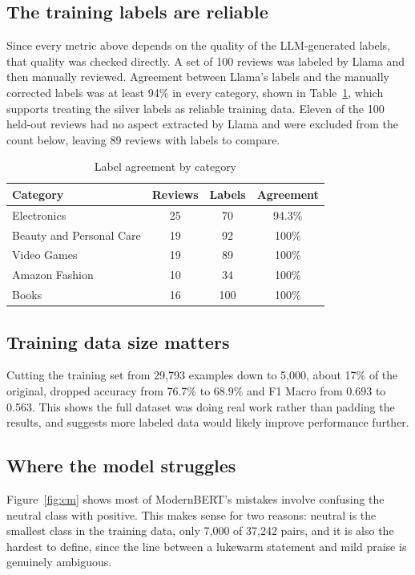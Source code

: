 \documentclass[sigconf]{acmart}
\begin{document}
\subsection{The training labels are reliable}

Since every metric above depends on the quality of the LLM-generated labels, that quality was checked directly. A set of 100 reviews was labeled by Llama and then manually reviewed. Agreement between Llama's labels and the manually corrected labels was at least 94\% in every category, shown in Table~\ref{tab:agreement}, which supports treating the silver labels as reliable training data. Eleven of the 100 held-out reviews had no aspect extracted by Llama and were excluded from the count below, leaving 89 reviews with labels to compare.

\begin{table}[h]
\centering
\caption{Label agreement by category}
\label{tab:agreement}
\begin{tabular}{lccc}
\toprule
\textbf{Category} & \textbf{Reviews} & \textbf{Labels} & \textbf{Agreement} \\
\midrule
Electronics & 25 & 70 & 94.3\% \\
Beauty and Personal Care & 19 & 92 & 100\% \\
Video Games & 19 & 89 & 100\% \\
Amazon Fashion & 10 & 34 & 100\% \\
Books & 16 & 100 & 100\% \\
\bottomrule
\end{tabular}
\end{table}

\subsection{Training data size matters}

Cutting the training set from 29,793 examples down to 5,000, about 17\% of the original, dropped accuracy from 76.7\% to 68.9\% and F1 Macro from 0.693 to 0.563. This shows the full dataset was doing real work rather than padding the results, and suggests more labeled data would likely improve performance further.

\subsection{Where the model struggles}

Figure~\ref{fig:cm} shows most of ModernBERT's mistakes involve confusing the neutral class with positive. This makes sense for two reasons: neutral is the smallest class in the training data, only 7,000 of 37,242 pairs, and it is also the hardest to define, since the line between a lukewarm statement and mild praise is genuinely ambiguous.
\end{document}

